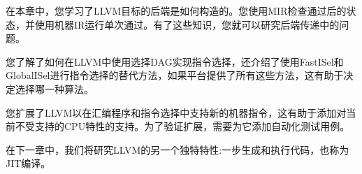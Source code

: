 在本章中，您学习了LLVM目标的后端是如何构造的。您使用MIR检查通过后的状态，并使用机器IR运行单次通过。有了这些知识，您就可以研究后端传递中的问题。\par

您了解了如何在LLVM中使用选择DAG实现指令选择，还介绍了使用FastISel和GlobalISel进行指令选择的替代方法，如果平台提供了所有这些方法，这有助于决定选择哪一种算法。\par

您扩展了LLVM以在汇编程序和指令选择中支持新的机器指令，这有助于添加对当前不受支持的CPU特性的支持。为了验证扩展，需要为它添加自动化测试用例。\par

在下一章中，我们将研究LLVM的另一个独特特性:一步生成和执行代码，也称为JIT编译。\par

\newpage